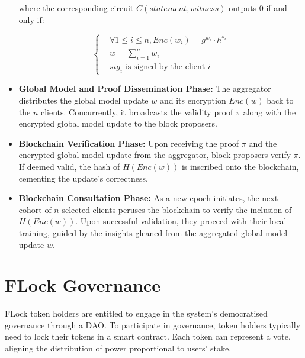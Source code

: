 \documentclass[conference]{IEEEtran}
\begin{document}
\begin{itemize}
where the corresponding circuit $C(statement, witness)$ outputs $0$ if and only if:

\begin{equation*}
    \begin{cases}
      & \text{$\forall 1\leq i \leq n, Enc(w_i) = g^{w_i} \cdot h^{s_i}$}\\
      & \text{$w = \sum_{i=1}^{n} {w_i}$}\\
       & \text{$sig_i$ is signed by the client $i$}
    \end{cases}       
\end{equation*}
    
    \item \textbf{Global Model and Proof Dissemination Phase:} The aggregator distributes the global model update $w$ and its encryption $Enc(w)$ back to the $n$ clients. Concurrently, it broadcasts the validity proof $\pi$ along with the encrypted global model update to the block proposers.





    \item \textbf{Blockchain Verification Phase:} Upon receiving the proof $\pi$ and the encrypted global model update from the aggregator, block proposers verify $\pi$. If deemed valid, the hash of $H(Enc(w))$ is inscribed onto the blockchain, cementing the update's correctness.
    
    \item \textbf{Blockchain Consultation Phase:} As a new epoch initiates, the next cohort of $n$ selected clients peruses the blockchain to verify the inclusion of $H(Enc(w))$. Upon successful validation, they proceed with their local training, guided by the insights gleaned from the aggregated global model update $w$.
\end{itemize}


\section{FLock Governance}

FLock token holders are entitled to engage in the system's democratised governance through a DAO. To participate in governance, token holders typically need to lock their tokens in a smart contract. Each token can represent a vote, aligning the distribution of power proportional to users' stake.  
\end{document}
